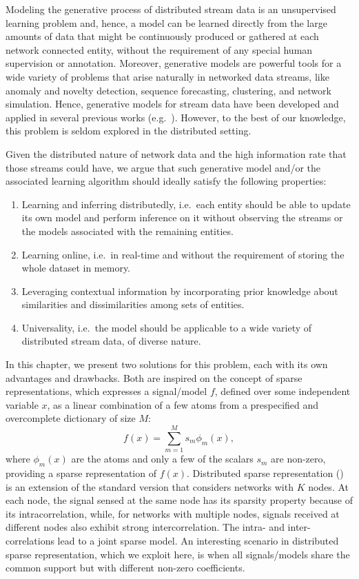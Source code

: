 Modeling the generative process of distributed stream data is an unsupervised learning problem and, hence, a model can be learned directly from the large amounts of data that might be continuously produced or gathered at each network connected entity, without the requirement of any special human supervision or annotation. Moreover, generative models are powerful tools for a wide variety of problems that arise naturally in networked data streams, like anomaly and novelty detection, sequence forecasting, clustering, and network simulation. Hence, generative models for stream data have been developed and applied in several previous works (e.g.\ \citet{Laxman2008, Hayat2010, Hofmann2011}). However, to the best of our knowledge, this problem is seldom explored in the  distributed setting.

Given the distributed nature of network data and the high information rate that those streams could have, we argue that such generative model and/or the associated learning algorithm should ideally satisfy the following properties:
\begin{enumerate}
	\item Learning and inferring distributedly, i.e.\ each entity should be able to update its own model and perform inference on it without observing the streams or the models associated with the remaining entities.
	\item Learning online, i.e.\ in real-time and without the requirement of storing the whole dataset in memory.
	\item Leveraging contextual information by incorporating prior knowledge about similarities and dissimilarities among sets of entities.
	\item Universality, i.e.\ the model should be applicable to a wide variety of distributed stream data, of diverse nature.
\end{enumerate}
In this chapter, we present two solutions for this problem, each with its own advantages and drawbacks. Both are inspired on the concept of sparse representations, which expresses a signal/model $f$, defined over some independent variable $x$, as a linear combination of a few atoms from a prespecified and overcomplete dictionary of size $M$:
\begin{equation}
\label{sparse_coding}
f(x)=\sum_{m=1}^M s_m \phi_m(x),
\end{equation}
where $\phi_m(x)$ are the atoms and only a few of the scalars $s_m$ are non-zero, providing a sparse representation of $f(x)$.  Distributed sparse representation (\citet{Baron}) is an extension of the standard version that considers networks with $K$ nodes. At each node, the signal sensed at the same node has its sparsity property because of its intracorrelation, while, for networks with multiple nodes, signals received at different nodes also exhibit strong intercorrelation.
The intra- and inter-correlations lead to a joint sparse model. An interesting scenario in distributed sparse representation, which we exploit here, is when all signals/models share the common support but with different non-zero coefficients.

